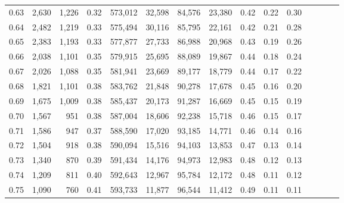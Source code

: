 \begin{tabular}{rrrcrrrrrrrrrrr}
0.63 &   2,630 &  1,226 &                                       0.32 &  573,012 &   32,598 &   84,576 &   23,380 &  0.42 &  0.22 &                         0.30 \\
0.64 &   2,482 &  1,219 &                                       0.33 &  575,494 &   30,116 &   85,795 &   22,161 &  0.42 &  0.21 &                         0.28 \\
0.65 &   2,383 &  1,193 &                                       0.33 &  577,877 &   27,733 &   86,988 &   20,968 &  0.43 &  0.19 &                         0.26 \\
0.66 &   2,038 &  1,101 &                                       0.35 &  579,915 &   25,695 &   88,089 &   19,867 &  0.44 &  0.18 &                         0.24 \\
0.67 &   2,026 &  1,088 &                                       0.35 &  581,941 &   23,669 &   89,177 &   18,779 &  0.44 &  0.17 &                         0.22 \\
0.68 &   1,821 &  1,101 &                                       0.38 &  583,762 &   21,848 &   90,278 &   17,678 &  0.45 &  0.16 &                         0.20 \\
0.69 &   1,675 &  1,009 &                                       0.38 &  585,437 &   20,173 &   91,287 &   16,669 &  0.45 &  0.15 &                         0.19 \\
0.70 &   1,567 &    951 &                                       0.38 &  587,004 &   18,606 &   92,238 &   15,718 &  0.46 &  0.15 &                         0.17 \\
0.71 &   1,586 &    947 &                                       0.37 &  588,590 &   17,020 &   93,185 &   14,771 &  0.46 &  0.14 &                         0.16 \\
0.72 &   1,504 &    918 &                                       0.38 &  590,094 &   15,516 &   94,103 &   13,853 &  0.47 &  0.13 &                         0.14 \\
0.73 &   1,340 &    870 &                                       0.39 &  591,434 &   14,176 &   94,973 &   12,983 &  0.48 &  0.12 &                         0.13 \\
0.74 &   1,209 &    811 &                                       0.40 &  592,643 &   12,967 &   95,784 &   12,172 &  0.48 &  0.11 &                         0.12 \\
0.75 &   1,090 &    760 &                                       0.41 &  593,733 &   11,877 &   96,544 &   11,412 &  0.49 &  0.11 &                         0.11 \\

\end{tabular}
